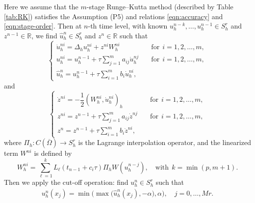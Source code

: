Here we assume that the  $m$-stage Runge--Kutta method (described by Table \ref{tab:RK}) satisfies
the Assumption (P5) and relations \eqref{eqn:accuracy} and \eqref{eqn:stage-order}. Then at $n$-th time level,
with known $u_h^{n-k}, \ldots, u_h^{n-1} \in S_h^r$ and $z^{n-1}\in \mathbb{R}$,
we find $\hat u_h^n \in S_h^r$ and $z^n\in \mathbb{R}$ such that
\begin{equation}\label{eqn:AC-sav-fully}
    \begin{cases}
    \dot u_h^{ni} = \Delta_h u_h^{ni} +  z^{ni} W_h^{ni}&\quad \text{for} ~~i=1,2,\dots,m, \\ %
    u_h^{ni} = u_h^{n-1} + \tau \sum_{j=1}^m a_{ij} \dot u_h^{nj} &\quad \text{for} ~~i=1,2,\dots,m, \\
    \hat u_h^{n} = u_h^{n-1} + \tau \sum_{i=1}^m b_i \dot u_h^{ni},
  \end{cases}
\end{equation}
and
\begin{equation}\label{eqn:r-fully}
\begin{cases}
    \dot z^{ni} = - \dfrac12(W_h^{ni},   \dot u_h^{ni})_h &\quad \text{for} ~~i=1,2,\dots,m, \\
    z^{ni} = z^{n-1} + \tau \sum_{j=1}^m a_{ij}  \dot z^{nj}&\quad \text{for} ~~i=1,2,\dots,m, \\
   z^{n} = z^{n-1} +  \tau \sum_{i=1}^m b_i  \dot z^{ni},
 \end{cases}
\end{equation}
where $\Pi_h:C(\overline\Omega)\rightarrow S_h^r$ is the Lagrange interpolation operator, and the linearized term $W^{ni}$ is  defined by
$$ W_h^{ni} =  \sum_{\ell=1}^k L_{\ell}(t_{n-1}+c_i\tau)\Pi_h W(u_h^{n-j}),\quad \text{with} ~~k=\min(p,m+1). $$
Then we apply the cut-off operation: find $u_h^n \in S_h^r$ such that
\begin{equation}\label{eqn:truncation-fully-sav}
\begin{split}
u_h^n(x_j)  = \min\big(\max \big(\hat u_h^n(x_j), - \alpha \big) , \alpha \big),  \quad j=0,\dots,Mr.
\end{split}
\end{equation}


